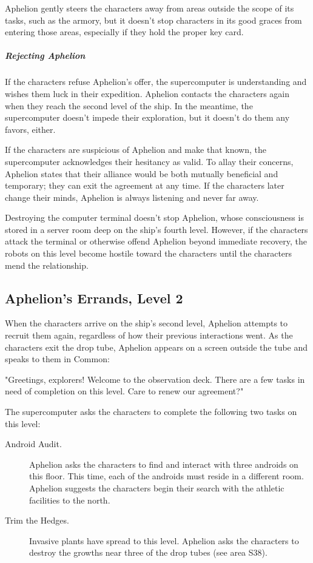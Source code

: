 \documentclass[10pt,a4paper,twoside,bg=print,twocolumn,openany,nodeprecatedcode]{dndbook}
\begin{document}
Aphelion gently steers the characters away from areas outside the scope of its tasks, such as the armory, but it doesn't stop characters in its good graces from entering those areas, especially if they hold the proper key card.

\subparagraph{Rejecting Aphelion}
If the characters refuse Aphelion's offer, the supercomputer is understanding and wishes them luck in their expedition. Aphelion contacts the characters again when they reach the second level of the ship. In the meantime, the supercomputer doesn't impede their exploration, but it doesn't do them any favors, either.

If the characters are suspicious of Aphelion and make that known, the supercomputer acknowledges their hesitancy as valid. To allay their concerns, Aphelion states that their alliance would be both mutually beneficial and temporary; they can exit the agreement at any time. If the characters later change their minds, Aphelion is always listening and never far away.

Destroying the computer terminal doesn't stop Aphelion, whose consciousness is stored in a server room deep on the ship's fourth level. However, if the characters attack the terminal or otherwise offend Aphelion beyond immediate recovery, the robots on this level become hostile toward the characters until the characters mend the relationship.

\subsection{Aphelion's Errands, Level 2}
When the characters arrive on the ship's second level, Aphelion attempts to recruit them again, regardless of how their previous interactions went. As the characters exit the drop tube, Aphelion appears on a screen outside the tube and speaks to them in Common:

\begin{DndReadAloud}{}
"Greetings, explorers! Welcome to the observation deck. There are a few tasks in need of completion on this level. Care to renew our agreement?"

\end{DndReadAloud}

The supercomputer asks the characters to complete the following two tasks on this level:


\begin{description}
\item[Android Audit.]
Aphelion asks the characters to find and interact with three androids on this floor. This time, each of the androids must reside in a different room. Aphelion suggests the characters begin their search with the athletic facilities to the north.
\item[Trim the Hedges.]
Invasive plants have spread to this level. Aphelion asks the characters to destroy the growths near three of the drop tubes (see area S38).
\end{description}
\end{document}
